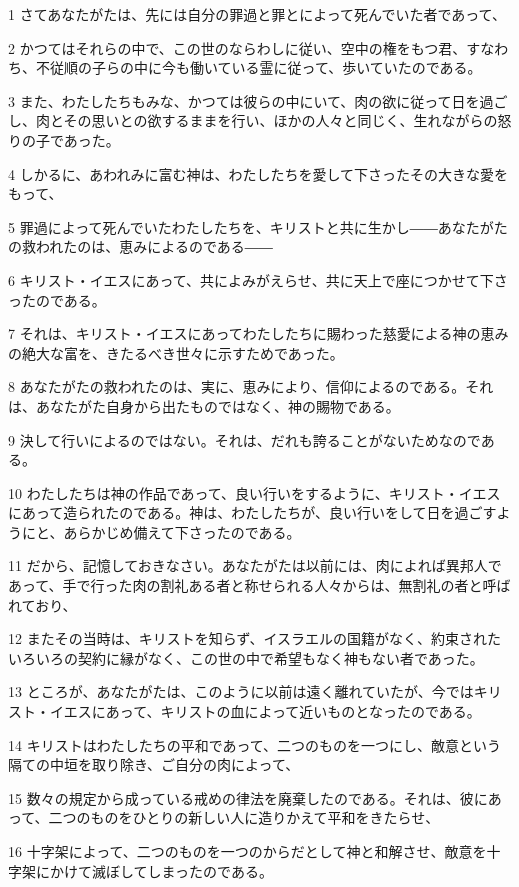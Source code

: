 \par 1 さてあなたがたは、先には自分の罪過と罪とによって死んでいた者であって、
\par 2 かつてはそれらの中で、この世のならわしに従い、空中の権をもつ君、すなわち、不従順の子らの中に今も働いている霊に従って、歩いていたのである。
\par 3 また、わたしたちもみな、かつては彼らの中にいて、肉の欲に従って日を過ごし、肉とその思いとの欲するままを行い、ほかの人々と同じく、生れながらの怒りの子であった。
\par 4 しかるに、あわれみに富む神は、わたしたちを愛して下さったその大きな愛をもって、
\par 5 罪過によって死んでいたわたしたちを、キリストと共に生かし――あなたがたの救われたのは、恵みによるのである――
\par 6 キリスト・イエスにあって、共によみがえらせ、共に天上で座につかせて下さったのである。
\par 7 それは、キリスト・イエスにあってわたしたちに賜わった慈愛による神の恵みの絶大な富を、きたるべき世々に示すためであった。
\par 8 あなたがたの救われたのは、実に、恵みにより、信仰によるのである。それは、あなたがた自身から出たものではなく、神の賜物である。
\par 9 決して行いによるのではない。それは、だれも誇ることがないためなのである。
\par 10 わたしたちは神の作品であって、良い行いをするように、キリスト・イエスにあって造られたのである。神は、わたしたちが、良い行いをして日を過ごすようにと、あらかじめ備えて下さったのである。
\par 11 だから、記憶しておきなさい。あなたがたは以前には、肉によれば異邦人であって、手で行った肉の割礼ある者と称せられる人々からは、無割礼の者と呼ばれており、
\par 12 またその当時は、キリストを知らず、イスラエルの国籍がなく、約束されたいろいろの契約に縁がなく、この世の中で希望もなく神もない者であった。
\par 13 ところが、あなたがたは、このように以前は遠く離れていたが、今ではキリスト・イエスにあって、キリストの血によって近いものとなったのである。
\par 14 キリストはわたしたちの平和であって、二つのものを一つにし、敵意という隔ての中垣を取り除き、ご自分の肉によって、
\par 15 数々の規定から成っている戒めの律法を廃棄したのである。それは、彼にあって、二つのものをひとりの新しい人に造りかえて平和をきたらせ、
\par 16 十字架によって、二つのものを一つのからだとして神と和解させ、敵意を十字架にかけて滅ぼしてしまったのである。
